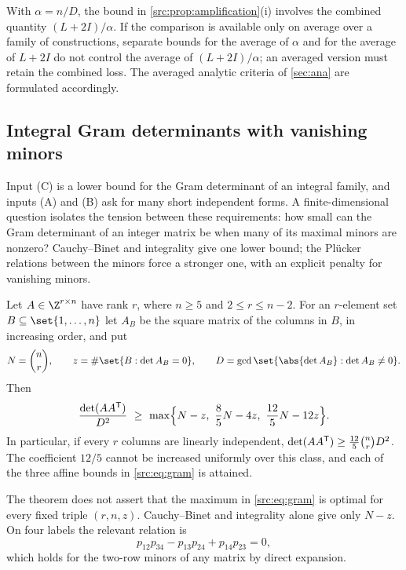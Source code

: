 \begin{remark}[Averaging]\label{src:rem:averaging}
With $\alpha=n/D$, the bound in \cref{src:prop:amplification}(i) involves the combined
quantity $(L+2I)/\alpha$. If the comparison is available only on average over a family of
constructions, separate bounds for the average of $\alpha$ and for the average of $L+2I$ do
not control the average of $(L+2I)/\alpha$; an averaged version must retain the combined loss.
The averaged analytic criteria of \cref{sec:ana} are formulated accordingly.
\end{remark}

\subsection{Integral Gram determinants with vanishing minors}\label{src:sec:gram}
\begingroup\raggedright
{}
\endgroup

Input (C) is a lower bound for the Gram determinant of an integral family, and inputs (A) and
(B) ask for many short independent forms. A finite-dimensional question isolates the tension
between these requirements: how small can the Gram determinant of an integer matrix be when
many of its maximal minors are nonzero? Cauchy--Binet and integrality give one lower bound; the
Pl\"ucker relations between the minors force a stronger one, with an explicit penalty for
vanishing minors.

\begin{theorem}\label{src:thm:gram}
Let $A\in\Z^{r\times n}$ have rank $r$, where $n\ge5$ and $2\le r\le n-2$. For an $r$-element
set $B\subseteq\set{1,\dots,n}$ let $A_B$ be the square matrix of the columns in $B$, in
increasing order, and put
\[
 N=\binom nr,\qquad z=\#\set{B:\det A_B=0},\qquad
 D=\gcd\set{\abs{\det A_B}:\det A_B\ne0}.
\]
Then
\begin{equation}\label{src:eq:gram}
 \frac{\det(AA^{\srctr})}{D^2}\ \ge\ \max\Bigl\{N-z,\ \frac85N-4z,\ \frac{12}5N-12z\Bigr\}.
\end{equation}
In particular, if every $r$ columns are linearly independent,
$\det(AA^{\mathsf{T}})\ge\tfrac{12}5\binom nrD^2$. The coefficient $12/5$ cannot be increased
uniformly over this class, and each of the three affine bounds in \eqref{src:eq:gram} is
attained.
\end{theorem}

The theorem does not assert that the maximum in \eqref{src:eq:gram} is optimal for every fixed
triple $(r,n,z)$. Cauchy--Binet and integrality alone give only $N-z$. On four labels the
relevant relation is
\begin{equation}\label{src:eq:plucker}
 p_{12}p_{34}-p_{13}p_{24}+p_{14}p_{23}=0,
\end{equation}
which holds for the two-row minors of any matrix by direct expansion.

